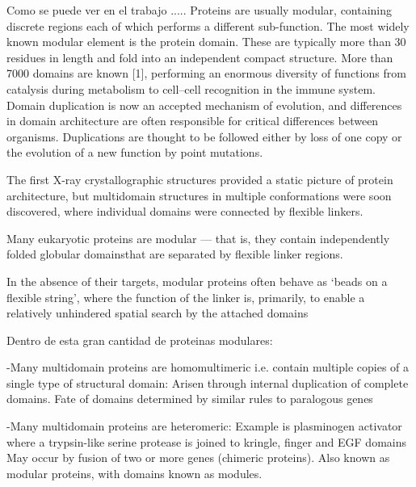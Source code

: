 Como se puede ver en el trabajo \cite{neduva2005linear}.....
Proteins are usually modular, containing discrete regions each of which performs a different sub-function. 
The most widely known modular element is the protein domain. These are typically more than 30 residues in length and fold into an independent compact structure. 
More than 7000 domains are known [1], performing an enormous diversity of functions from catalysis during metabolism to cell–cell recognition in the
immune system. Domain duplication is now an accepted mechanism of evolution, and differences in domain architecture are often responsible for critical differences between organisms.
Duplications are thought to be followed either by loss of one copy or the evolution of a new function by point mutations.













The first X-ray crystallographic structures provided a static picture of protein architecture, but multidomain structures in multiple conformations were soon discovered, where individual domains were connected by flexible linkers.

Many eukaryotic proteins are modular — that is, they contain independently folded globular domainsthat are separated by flexible linker regions. 

In the absence of their targets, modular proteins
often behave as ‘beads on a flexible string’, where the
function of the linker is, primarily, to enable a relatively
unhindered spatial search by the attached domains


Dentro de esta gran cantidad de proteinas modulares:

-Many multidomain proteins are homomultimeric i.e. contain multiple copies of a single type of structural domain: Arisen through internal duplication of complete domains. Fate of domains determined by similar rules to paralogous genes

-Many multidomain proteins are heteromeric: Example is plasminogen activator where a trypsin-like serine protease is joined to kringle, finger and EGF domains
May occur by fusion of two or more genes (chimeric proteins). Also known as modular proteins, with domains known as modules. 

